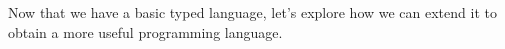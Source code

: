 
Now that we have a basic typed language, let’s explore how we can extend it to
obtain a more useful programming language.

\secdown








\secup
